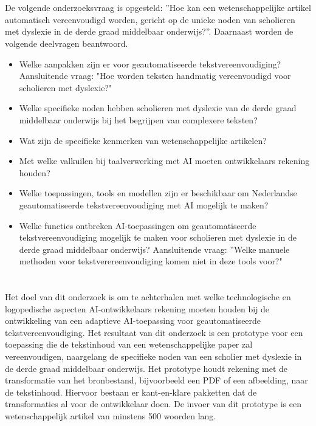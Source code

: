 \section{}%
\label{sec:onderzoeksvraag}

De volgende onderzoeksvraag is opgesteld: ”Hoe kan een wetenschappelijke artikel automatisch vereenvoudigd worden, gericht op de unieke noden van scholieren met dyslexie in de derde graad middelbaar onderwijs?”. Daarnaast worden de volgende deelvragen beantwoord.

\begin{itemize}
	\item Welke aanpakken zijn er voor geautomatiseerde tekstvereenvoudiging? Aansluitende vraag: "Hoe worden teksten handmatig vereenvoudigd voor scholieren met dyslexie?"
	\item Welke specifieke noden hebben scholieren met dyslexie van de derde graad middelbaar onderwijs bij het begrijpen van complexere teksten?
	\item Wat zijn de specifieke kenmerken van wetenschappelijke artikelen?
	\item Met welke valkuilen bij taalverwerking met AI moeten ontwikkelaars rekening houden?
	\item Welke toepassingen, tools en modellen zijn er beschikbaar om Nederlandse geautomatiseerde tekstvereenvoudiging met AI mogelijk te maken?
	\item Welke functies ontbreken AI-toepassingen om geautomatiseerde tekstvereenvoudiging mogelijk te maken voor scholieren met dyslexie in de derde graad middelbaar onderwijs? Aansluitende vraag: ”Welke manuele methoden voor tekstverereenvoudiging komen niet in deze tools voor?"
\end{itemize}


\section{}%
\label{sec:onderzoeksdoelstelling}


Het doel van dit onderzoek is om te achterhalen met welke technologische en logopedische aspecten AI-ontwikkelaars rekening moeten houden bij de ontwikkeling van een adaptieve AI-toepassing voor geautomatiseerde tekstvereenvoudiging. Het resultaat van dit onderzoek is een prototype voor een toepassing die de tekstinhoud van een wetenschappelijke paper zal vereenvoudigen, naargelang de specifieke noden van een scholier met dyslexie in de derde graad middelbaar onderwijs. Het prototype houdt rekening met de transformatie van het bronbestand, bijvoorbeeld een PDF of een afbeelding, naar de tekstinhoud. Hiervoor bestaan er kant-en-klare pakketten dat de transformaties al voor de ontwikkelaar doen. De invoer van dit prototype is een wetenschappelijk artikel van minstens 500 woorden lang.

